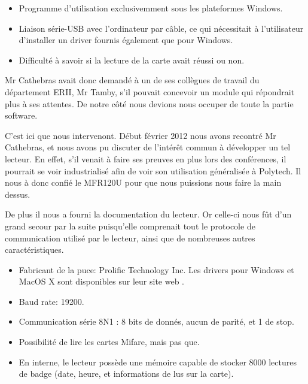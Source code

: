     \begin{itemize}
        \item Programme d'utilisation exclusivemment sous les plateformes Windows.
        \item Liaison série-USB avec l'ordinateur par câble, ce qui nécessitait 
              à l'utilisateur d'installer un driver fournis également que pour
              Windows.
        \item Difficulté à savoir si la lecture de la carte avait réussi ou non.
    \end{itemize}

    Mr Cathebras avait donc demandé à un de ses collègues de travail du département
ERII, Mr Tamby, s'il pouvait concevoir un module qui répondrait plus à ses attentes.
De notre côté nous devions nous occuper de toute la partie software.

    C'est ici que nous intervenont. Début février 2012 nous avons recontré Mr Cathebras,
et nous avons pu discuter de l'intérêt commun à développer un tel lecteur. En effet,
s'il venait à faire ses preuves en plus lors des conférences, il pourrait se voir
industrialisé afin de voir son utilisation généralisée à Polytech. Il nous à donc
confié le MFR120U pour que nous puissions nous faire la main dessus.

    De plus il nous a fourni la documentation du lecteur. Or celle-ci nous fût d'un
grand secour par la suite puisqu'elle comprenait tout le protocole de communication
utilisé par le lecteur, ainsi que de nombreuses autres caractéristiques.

    \begin{itemize}
        \item Fabricant de la puce: Prolific Technology Inc. Les drivers pour Windows
              et MacOS X sont disponibles sur leur site web \cite{prolific}.
        \item Baud rate: 19200.
        \item Communication série 8N1 : 8 bits de donnés, aucun de parité, et 1 de stop.
        \item Possibilité de lire les cartes Mifare, mais pas que.
        \item En interne, le lecteur possède une mémoire capable de stocker 8000
              lectures de badge (date, heure, et informations de lus sur la carte).
    \end{itemize}

